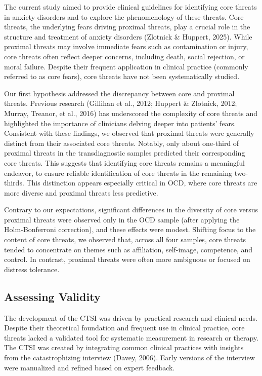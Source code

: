 \documentclass[
  man,floatsintext]{apa7}
\begin{document}
The current study aimed to provide clinical guidelines for identifying core threats in anxiety disorders and to explore the phenomenology of these threats.
Core threats, the underlying fears driving proximal threats, play a crucial role in the structure and treatment of anxiety disorders (Zlotnick \& Huppert, 2025).
While proximal threats may involve immediate fears such as contamination or injury, core threats often reflect deeper concerns, including death, social rejection, or moral failure.
Despite their frequent application in clinical practice (commonly referred to as core fears), core threats have not been systematically studied.

Our first hypothesis addressed the discrepancy between core and proximal threats.
Previous research (Gillihan et al., 2012; Huppert \& Zlotnick, 2012; Murray, Treanor, et al., 2016) has underscored the complexity of core threats and highlighted the importance of clinicians delving deeper into patients' fears.
Consistent with these findings, we observed that proximal threats were generally distinct from their associated core threats.
Notably, only about one-third of proximal threats in the transdiagnostic samples predicted their corresponding core threats.
This suggests that identifying core threats remains a meaningful endeavor, to ensure reliable identification of core threats in the remaining two-thirds.
This distinction appears especially critical in OCD, where core threats are more diverse and proximal threats less predictive.

Contrary to our expectations, significant differences in the diversity of core versus proximal threats were observed only in the OCD sample (after applying the Holm-Bonferroni correction), and these effects were modest.
Shifting focus to the content of core threats, we observed that, across all four samples, core threats tended to concentrate on themes such as affiliation, self-image, competence, and control.
In contrast, proximal threats were often more ambiguous or focused on distress tolerance.

\subsection{Assessing Validity}\label{assessing-validity}

The development of the CTSI was driven by practical research and clinical needs.
Despite their theoretical foundation and frequent use in clinical practice, core threats lacked a validated tool for systematic measurement in research or therapy.
The CTSI was created by integrating common clinical practices with insights from the catastrophizing interview (Davey, 2006).
Early versions of the interview were manualized and refined based on expert feedback.
\end{document}
